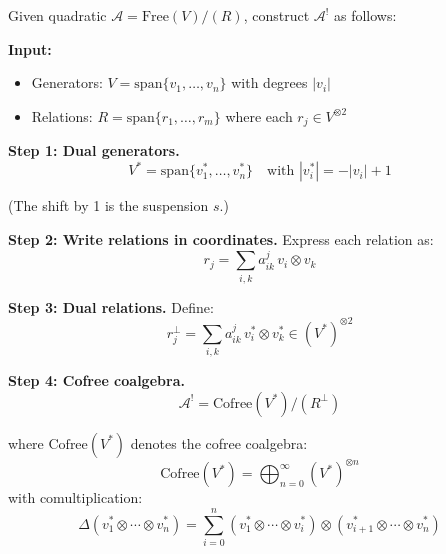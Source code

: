 \begin{construction}\label{const:quadratic-dual}
Given quadratic $\mathcal{A} = \text{Free}(V) / (R)$, construct $\mathcal{A}^!$ as follows:

\textbf{Input:}
\begin{itemize}
\item Generators: $V = \text{span}\{v_1, \ldots, v_n\}$ with degrees $|v_i|$
\item Relations: $R = \text{span}\{r_1, \ldots, r_m\}$ where each $r_j \in V^{\otimes 2}$
\end{itemize}

\textbf{Step 1: Dual generators.}
$$V^* = \text{span}\{v_1^*, \ldots, v_n^*\} \quad \text{with } |v_i^*| = -|v_i| + 1$$

(The shift by 1 is the suspension $s$.)

\textbf{Step 2: Write relations in coordinates.}
Express each relation as:
$$r_j = \sum_{i,k} a_{ik}^j \, v_i \otimes v_k$$

\textbf{Step 3: Dual relations.}
Define:
$$r_j^\perp = \sum_{i,k} a_{ik}^j \, v_i^* \otimes v_k^* \in (V^*)^{\otimes 2}$$

\textbf{Step 4: Cofree coalgebra.}
$$\mathcal{A}^! = \text{Cofree}(V^*) / (R^\perp)$$

where $\text{Cofree}(V^*)$ denotes the cofree coalgebra:
$$\text{Cofree}(V^*) = \bigoplus_{n=0}^\infty (V^*)^{\otimes n}$$
with comultiplication:
$$\Delta(v_1^* \otimes \cdots \otimes v_n^*) = \sum_{i=0}^n 
(v_1^* \otimes \cdots \otimes v_i^*) \otimes (v_{i+1}^* \otimes \cdots \otimes v_n^*)$$
\end{construction}

